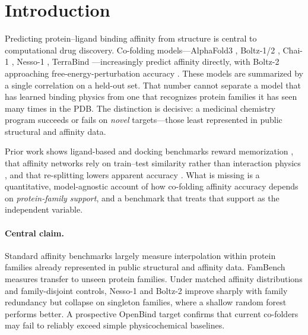\documentclass[11pt]{article}
\begin{document}
\section{Introduction}

Predicting protein--ligand binding affinity from structure is central to computational drug
discovery. Co-folding models---AlphaFold3 \citep{abramson2024alphafold3}, Boltz-1/2
\citep{wohlwend2024boltz1,passaro2025boltz2}, Chai-1 \citep{chai2024chai1}, Nesso-1
\citep{valencelabs2026nesso1}, TerraBind \citep{terray2026terrabind}---increasingly predict
affinity directly, with Boltz-2 approaching free-energy-perturbation accuracy
\citep{passaro2025boltz2}. These models are summarized by a single correlation on a held-out set.
That number cannot separate a model that has learned binding physics from one that recognizes
protein families it has seen many times in the PDB. The distinction is decisive: a medicinal
chemistry program succeeds or fails on \emph{novel} targets---those least represented in public
structural and affinity data.

Prior work shows ligand-based and docking benchmarks reward memorization
\citep{wallach2018memorization,chen2019dude}, that affinity networks rely on train--test
similarity rather than interaction physics \citep{volkov2022frustration,kanakala2023latentbiases},
and that re-splitting lowers apparent accuracy \citep{li2023leakproof}. What is missing is a
quantitative, model-agnostic account of how co-folding affinity accuracy depends on
\emph{protein-family support}, and a benchmark that treats that support as the independent
variable.

\paragraph{Central claim.} Standard affinity benchmarks largely measure interpolation within
protein families already represented in public structural and affinity data. FamBench measures
transfer to unseen protein families. Under matched affinity distributions and family-disjoint
controls, Nesso-1 and Boltz-2 improve sharply with family redundancy but collapse on singleton
families, where a shallow random forest performs better. A prospective OpenBind target confirms
that current co-folders may fail to reliably exceed simple physicochemical baselines.
\end{document}
